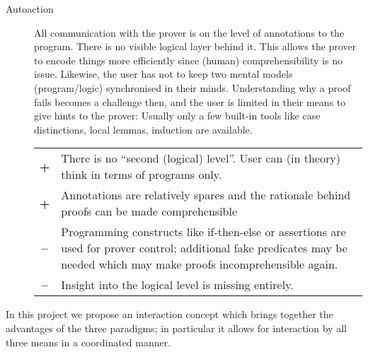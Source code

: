 \documentclass{article}
\newcommand{\plus}{\textbf{+}}
\newcommand{\minus}{\textbf{--}}
\begin{document}
\begin{description}
\item[Autoaction] All communication with the prover is on the level of
  annotations to the program. There is no visible logical layer behind
  it. This allows the prover to encode things more efficiently since
  (human) comprehensibility is no issue. Likewise, the user has not to
  keep two mental models (program/logic) synchronised in their
  minds. Understanding why a proof fails becomes a challenge then, and
  the user is limited in their means to give hints to the prover:
  Usually only a few built-in tools like case distinctions, local
  lemmas, induction are available.\\
  \begin{tabularx}{\linewidth}{cX}
    \plus & There is no ``second (logical) level''. User can (in
    theory) think in terms of programs only. \\
    \plus & Annotations are relatively spares and the rationale behind
    proofs can be made comprehensible\\
    \minus & Programming constructs like if-then-else or assertions
    are used for prover control; additional fake predicates may be
    needed which may make proofs incomprehensible again. \\
    \minus & Insight into the logical level is missing entirely.
  \end{tabularx}
\end{description}

In this project we propose an interaction concept which brings
together the advantages of the three paradigms; in particular it
allows for interaction by all three means in a coordinated manner.
\end{document}
